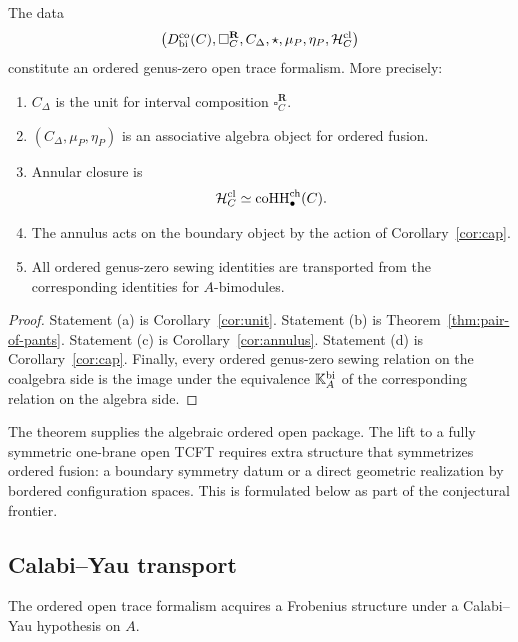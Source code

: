 \begin{theorem}
\label{thm:ordered-open}
The data
\[
\bigl(D^{\mathrm{co}}_{\mathrm{bi}}(C),\square_C^{\mathbf R},C_\Delta,\star,\mu_P,\eta_P,\mathcal H_C^{\mathrm{cl}}\bigr)
\]
constitute an ordered genus-zero open trace formalism. More precisely:
\begin{enumerate}[label=(\alph*)]
\item $C_\Delta$ is the unit for interval composition $\square_C^{\mathbf R}$.
\item $(C_\Delta,\mu_P,\eta_P)$ is an associative algebra object for ordered fusion.
\item Annular closure is
\[
\mathcal H_C^{\mathrm{cl}}\simeq \operatorname{coHH}^{\mathrm{ch}}_\bullet(C).
\]
\item The annulus acts on the boundary object by the action of
Corollary~\ref{cor:cap}.
\item All ordered genus-zero sewing identities are transported from the corresponding identities for
$A$-bimodules.
\end{enumerate}
\end{theorem}

\begin{proof}
Statement (a) is Corollary~\ref{cor:unit}. Statement (b) is
Theorem~\ref{thm:pair-of-pants}. Statement (c) is
Corollary~\ref{cor:annulus}. Statement (d) is Corollary~\ref{cor:cap}.
Finally, every ordered genus-zero sewing relation on the coalgebra side is the image under the
equivalence $\mathbb{K}_A^{\mathrm{bi}}$ of the corresponding relation on the algebra side.
\end{proof}

\begin{remark}
The theorem supplies the algebraic ordered open package. The lift
to a fully symmetric one-brane open TCFT requires extra structure
that symmetrizes ordered fusion: a boundary symmetry datum or a
direct geometric realization by bordered configuration spaces.
This is formulated below as part of the conjectural frontier.
\end{remark}

\subsection{Calabi--Yau transport}

The ordered open trace formalism acquires a Frobenius structure under a Calabi--Yau hypothesis on
$A$.


